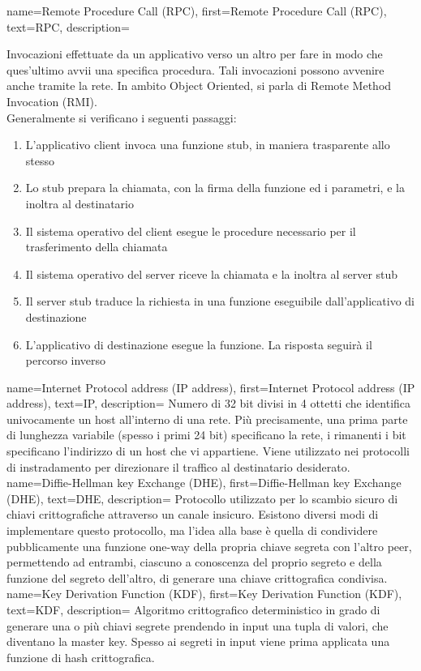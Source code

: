 {
    name={Remote Procedure Call (RPC)},
    first={Remote Procedure Call (RPC)},
    text={RPC},
    description={
            Invocazioni effettuate da un applicativo verso un altro per fare in modo che ques'ultimo avvii
            una specifica procedura.
            Tali invocazioni possono avvenire anche tramite la rete.
            In ambito Object Oriented, si parla di Remote Method Invocation (RMI). \\
            Generalmente si verificano i seguenti passaggi:
            \begin{enumerate}
                \item L'applicativo client invoca una funzione stub, in maniera trasparente allo stesso
                \item Lo stub prepara la chiamata, con la firma della funzione ed i parametri, e la inoltra al destinatario
                \item Il sistema operativo del client esegue le procedure necessario per il trasferimento della chiamata
                \item Il sistema operativo del server riceve la chiamata e la inoltra al server stub
                \item Il server stub traduce la richiesta in una funzione eseguibile dall'applicativo di destinazione
                \item L'applicativo di destinazione esegue la funzione. La risposta seguirà il percorso inverso
            \end{enumerate}
        }
}
{
    name={Internet Protocol address (IP address)},
    first={Internet Protocol address (IP address)},
    text={IP},
    description={
            Numero di 32 bit divisi in 4 ottetti che identifica univocamente un host all'interno di una rete.
            Più precisamente, una prima parte di lunghezza variabile (spesso i primi 24 bit) specificano la rete,
            i rimanenti i bit specificano l'indirizzo di un host che vi appartiene.
            Viene utilizzato nei protocolli di instradamento per direzionare il traffico al destinatario desiderato.
        }
}
{
    name={Diffie-Hellman key Exchange (DHE)},
    first={Diffie-Hellman key Exchange (DHE)},
    text={DHE},
    description={
            Protocollo utilizzato per lo scambio sicuro di chiavi crittografiche attraverso un canale insicuro.
            Esistono diversi modi di implementare questo protocollo, ma l'idea alla base è quella di condividere
            pubblicamente una funzione one-way della propria chiave segreta con l'altro peer, permettendo ad entrambi,
            ciascuno a conoscenza del proprio segreto e della funzione del segreto dell'altro, di generare una chiave crittografica condivisa.
        }
}
{
    name={Key Derivation Function (KDF)},
    first={Key Derivation Function (KDF)},
    text={KDF},
    description={
            Algoritmo crittografico deterministico in grado di generare una o più chiavi segrete
            prendendo in input una tupla di valori, che diventano la master key.
            Spesso ai segreti in input viene prima applicata una funzione di hash crittografica.
        }
}
